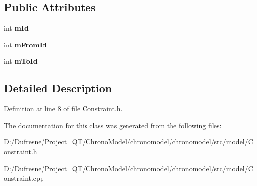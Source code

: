 \subsection*{Public Attributes}
\begin{DoxyCompactItemize}
\item 
\hypertarget{class_constraint_a81a5e8e48b2bebde7dfc1c904c3e61ba}{int {\bfseries m\-Id}}\label{class_constraint_a81a5e8e48b2bebde7dfc1c904c3e61ba}

\item 
\hypertarget{class_constraint_ace2396c7257a878a54fe985f9c199f9a}{int {\bfseries m\-From\-Id}}\label{class_constraint_ace2396c7257a878a54fe985f9c199f9a}

\item 
\hypertarget{class_constraint_a927097dd1b2a782417ba9d2c77a461ea}{int {\bfseries m\-To\-Id}}\label{class_constraint_a927097dd1b2a782417ba9d2c77a461ea}

\end{DoxyCompactItemize}


\subsection{Detailed Description}


Definition at line 8 of file Constraint.\-h.



The documentation for this class was generated from the following files\-:\begin{DoxyCompactItemize}
\item 
D\-:/\-Dufresne/\-Project\-\_\-\-Q\-T/\-Chrono\-Model/chronomodel/chronomodel/src/model/Constraint.\-h\item 
D\-:/\-Dufresne/\-Project\-\_\-\-Q\-T/\-Chrono\-Model/chronomodel/chronomodel/src/model/Constraint.\-cpp\end{DoxyCompactItemize}
